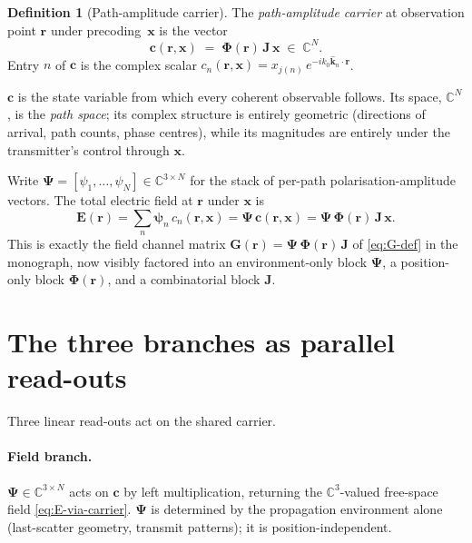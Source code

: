 \documentclass[11pt,a4paper]{article}
\theoremstyle{definition}
\newtheorem{definition}[definition]{Definition}
\newcommand{\khat}{\hat{\bm{k}}}
\newcommand{\rr}{\mathbf{r}}
\newcommand{\EE}{\mathbf{E}}
\newcommand{\Complex}{\mathbb{C}}
\newcommand{\Jmat}{\mathbf{J}}                 %
\newcommand{\Phimat}{\mathbf{\Phi}}            %
\newcommand{\Psimat}{\bm{\Psi}}                %
\newcommand{\xx}{\mathbf{x}}
\newcommand{\cvec}{\mathbf{c}}
\newcommand{\psin}{\bm{\psi}_n}
\newcommand{\GG}{\mathbf{G}}
\begin{document}
\begin{definition}[Path-amplitude carrier]\label{def:carrier}
The \emph{path-amplitude carrier} at observation point $\rr$ under
precoding~$\xx$ is the vector
\begin{equation}\label{eq:carrier}
  \boxed{\;
  \cvec(\rr,\xx)\;=\;\Phimat(\rr)\,\Jmat\,\xx\;\in\;\Complex^N.
  \;}
\end{equation}
Entry $n$ of $\cvec$ is the complex scalar
$c_n(\rr,\xx)=x_{j(n)}\,e^{-ik_0\khat_n\cdot\rr}$.
\end{definition}

$\cvec$ is the state variable from which every coherent observable follows.
Its space, $\Complex^N$, is the \emph{path space}; its complex structure
is entirely geometric (directions of arrival, path counts, phase centres),
while its magnitudes are entirely under the transmitter's control through
$\xx$.

Write $\Psimat=[\psi_1,\dots,\psi_N]\in\Complex^{3\times N}$ for the stack
of per-path polarisation-amplitude vectors.  The total electric field at
$\rr$ under $\xx$ is
\begin{equation}\label{eq:E-via-carrier}
  \EE(\rr)=\sum_n\psin\,c_n(\rr,\xx)=\Psimat\,\cvec(\rr,\xx)
         =\Psimat\,\Phimat(\rr)\,\Jmat\,\xx.
\end{equation}
This is exactly the field channel matrix
$\GG(\rr)=\Psimat\,\Phimat(\rr)\,\Jmat$ of \cref{eq:G-def} in the
monograph, now visibly factored into an environment-only block $\Psimat$,
a position-only block $\Phimat(\rr)$, and a combinatorial block $\Jmat$.

\section{The three branches as parallel read-outs}\label{sec:branches}

Three linear read-outs act on the shared carrier.

\paragraph{Field branch.} $\Psimat\in\Complex^{3\times N}$ acts on
$\cvec$ by left multiplication, returning the $\Complex^3$-valued
free-space field \eqref{eq:E-via-carrier}.  $\Psimat$ is determined by the
propagation environment alone (last-scatter geometry, transmit patterns);
it is position-independent.
\end{document}
